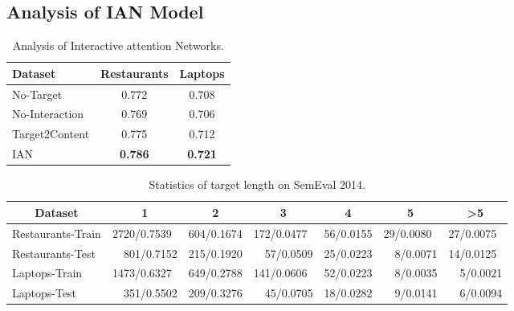 \documentclass{article}
\begin{document}
\subsection{Analysis of IAN Model}

\begin{table}[tbp]
	\begin{center}
    		\begin{tabular}{|l|c|c|}
			\hline
			Dataset           &Restaurants        &Laptops           \\ \hline \hline
			No-Target         &0.772 	          &0.708             \\ \hline
			No-Interaction 	  &0.769              &0.706             \\ \hline
			Target2Content   &0.775	          &0.712             \\ \hline
IAN               &\textbf{0.786}     &\textbf{0.721}    \\ \hline
		\end{tabular}
		\caption{Analysis of Interactive attention Networks.}
		\label{tab:analysis}
	\end{center}
\end{table}

\begin{table*}[]
\centering
\begin{tabular}{|l|l|l|l|l|l|l|}
\hline
\multicolumn{1}{|c|}{Dataset} & \multicolumn{1}{c|}{1} & \multicolumn{1}{c|}{2} & \multicolumn{1}{c|}{3} & \multicolumn{1}{c|}{4} & \multicolumn{1}{c|}{5} & \multicolumn{1}{c|}{\textgreater5} \\ \hline\hline
Restaurants-Train             & 2720/0.7539            & 604/0.1674             & 172/0.0477             & 56/0.0155              & 29/0.0080              & 27/0.0075                          \\ \hline
Restaurants-Test              & ~~801/0.7152             & 215/0.1920             & ~~57/0.0509              & 25/0.0223              & ~~8/0.0071               & 14/0.0125                          \\ \hline\hline
Laptops-Train                 & 1473/0.6327            & 649/0.2788             & 141/0.0606              & 52/0.0223              & ~~8/0.0035               & ~~5/0.0021                           \\ \hline
Laptops-Test                  & ~~351/0.5502             & 209/0.3276             & ~~45/0.0705              & 18/0.0282               & ~~9/0.0141               & ~~6/0.0094                           \\ \hline
\end{tabular}
\caption{Statistics of target length on SemEval 2014.}
\label{tab:target_length}
\end{table*}
\end{document}

